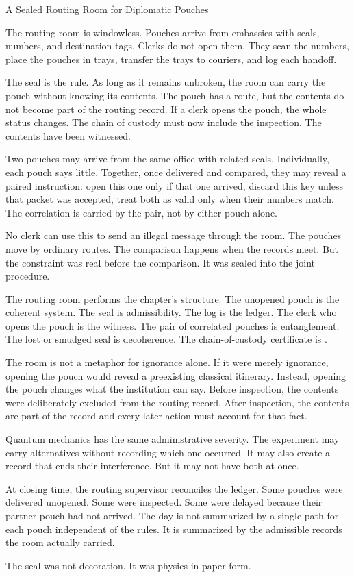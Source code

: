 \begin{coda}{A Sealed Routing Room for Diplomatic Pouches}

The routing room is windowless. Pouches arrive from embassies with seals,
numbers, and destination tags. Clerks do not open them. They scan the numbers,
place the pouches in trays, transfer the trays to couriers, and log each
handoff.

The seal is the rule. As long as it remains unbroken, the room can carry the
pouch without knowing its contents. The pouch has a route, but the contents do
not become part of the routing record. If a clerk opens the pouch, the whole
status changes. The chain of custody must now include the inspection. The
contents have been witnessed.

Two pouches may arrive from the same office with related seals. Individually,
each pouch says little. Together, once delivered and compared, they may reveal
a paired instruction: open this one only if that one arrived, discard this key
unless that packet was accepted, treat both as valid only when their numbers
match. The correlation is carried by the pair, not by either pouch alone.

No clerk can use this to send an illegal message through the room. The pouches
move by ordinary routes. The comparison happens when the records meet. But the
constraint was real before the comparison. It was sealed into the joint
procedure.

The routing room performs the chapter's structure. The unopened pouch is the
coherent system. The seal is admissibility. The log is the ledger. The clerk
who opens the pouch is the witness. The pair of correlated pouches is
entanglement. The lost or smudged seal is decoherence. The chain-of-custody
certificate is .

The room is not a metaphor for ignorance alone. If it were merely ignorance,
opening the pouch would reveal a preexisting classical itinerary. Instead,
opening the pouch changes what the institution can say. Before inspection, the
contents were deliberately excluded from the routing record. After inspection,
the contents are part of the record and every later action must account for
that fact.

Quantum mechanics has the same administrative severity. The experiment may
carry alternatives without recording which one occurred. It may also create a
record that ends their interference. But it may not have both at once.

At closing time, the routing supervisor reconciles the ledger. Some pouches
were delivered unopened. Some were inspected. Some were delayed because their
partner pouch had not arrived. The day is not summarized by a single path for
each pouch independent of the rules. It is summarized by the admissible records
the room actually carried.

The seal was not decoration. It was physics in paper form.

\end{coda}
